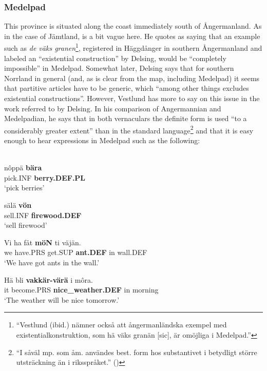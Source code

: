 \subsubsection{Medelpad}
 This province is situated along the coast immediately south of Ångermanland. As in the case of Jämtland, \citet[19]{Delsing2003a} is a bit vague here. He quotes \citet[21]{Vestlund1923} as saying that an example such as \textit{de väks granen}\footnote{ “Vestlund (ibid.) nämner också att ångermanländska exempel med existentialkonstruktion, som hä väks granän [sic], är omöjliga i Medelpad.”}, registered in Häggdånger in southern Ångermanland and labeled an “existential construction” by Delsing, would be “completely impossible” in Medelpad. Somewhat later, Delsing says that for southern Norrland in general (and, as is clear from the map, including Medelpad) it seems that partitive articles have to be generic, which “among other things excludes existential constructions”. However, Vestlund has more to say on this issue in the work referred to by Delsing. In his comparison of Angermannian and Medelpadian, he says that in both vernaculars the definite form is used “to a considerably greater extent” than in the standard language\footnote{ “I såväl mp. som åm. användes best. form hos substantivet i betydligt större utsträckning än i riksspråket.” (\citet[20]{Vestlund1923})} and that it is easy enough to hear expressions in Medelpad such as the following:


\ea\label{}
\\
\gll nôppä  \textbf{bära}\\
pick.INF  \textbf{berry.DEF.PL}\\
\glt ‘pick berries’

\z

\ea
\gll sälä  \textbf{vön} \\
sell.INF  \textbf{firewood.DEF} \\
\glt ‘sell firewood’

\z

\ea
\gll Vi  ha  fåt  \textbf{möN} ti  väjän.  \\
we  have.PRS  get.SUP  \textbf{ant.DEF} in  wall.DEF  \\
\glt ‘We have got ants in the wall.’

\z

\ea
\gll Hä  bli  \textbf{vakkär-värä} i  môra.\\
it  become.PRS  \textbf{nice\_weather.DEF} in  morning\\
\glt ‘The weather will be nice tomorrow.’

